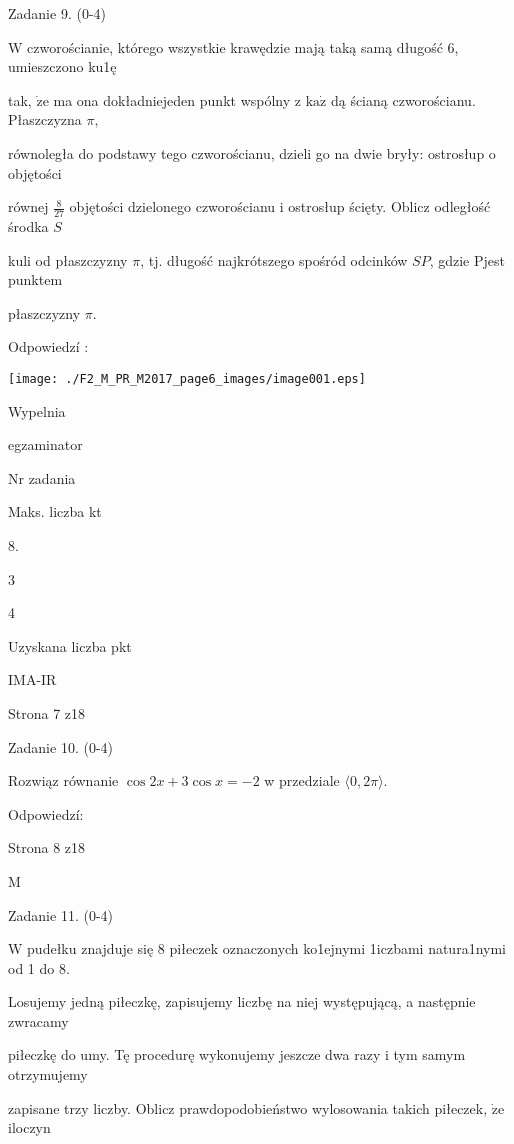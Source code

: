 \documentclass[a4paper,12pt]{article}
\begin{document}
Zadanie 9. (0-4)

$\mathrm{W}$ czworościanie, którego wszystkie krawędzie mają taką samą długość 6, umieszczono ku1ę

tak, $\dot{\mathrm{z}}\mathrm{e}$ ma ona dokładniejeden punkt wspólny z $\mathrm{k}\mathrm{a}\dot{\mathrm{z}}$ dą ścianą czworościanu. Płaszczyzna $\pi,$

równoległa do podstawy tego czworościanu, dzieli go na dwie bryły: ostrosłup o objętości

równej $\displaystyle \frac{8}{27}$ objętości dzielonego czworościanu i ostrosłup ścięty. Oblicz odległość środka $S$

kuli od płaszczyzny $\pi$, tj. długość najkrótszego spośród odcinków $SP$, gdzie Pjest punktem

płaszczyzny $\pi.$

Odpowiedzí :
\begin{center}
\texttt{[image: ./F2\_M\_PR\_M2017\_page6\_images/image001.eps]}
\end{center}
Wypelnia

egzaminator

Nr zadania

Maks. liczba kt

8.

3

4

Uzyskana liczba pkt

IMA-IR

Strona 7 z18





Zadanie 10. (0-4)

Rozwiąz równanie $\cos 2x+3\cos x=-2$ w przedziale $\langle 0, 2\pi\rangle.$

Odpowiedzí:

Strona 8 z18

M





Zadanie 11. (0-4)

$\mathrm{W}$ pudełku znajduje się 8 piłeczek oznaczonych ko1ejnymi 1iczbami natura1nymi od 1 do 8.

Losujemy jedną piłeczkę, zapisujemy liczbę na niej występującą, a następnie zwracamy

piłeczkę do umy. Tę procedurę wykonujemy jeszcze dwa razy i tym samym otrzymujemy

zapisane trzy liczby. Oblicz prawdopodobieństwo wylosowania takich piłeczek, $\dot{\mathrm{z}}\mathrm{e}$ iloczyn
\end{document}

